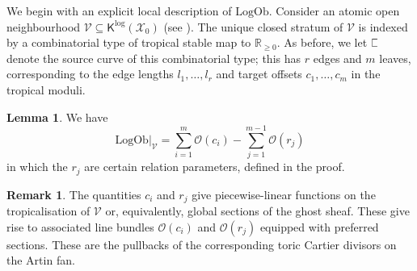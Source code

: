 \documentclass[11pt]{amsart}
\theoremstyle{definition}
\theoremstyle{definition}
\newtheorem{lemma}[theorem]{Lemma}
\newtheorem{remark}[theorem]{Remark}
\newcommand{\RR}{\mathbb{R}}
\newcommand{\sqC}{\scalebox{0.8}[1.2]{$\sqsubset$}}
\newcommand{\OO}{\mathcal{O}}
\newcommand{\LogOb}{\mathrm{LogOb}}
\newcommand{\Xcal}{\mathcal{X}}
\newcommand{\Kup}{\mathsf{K}}
\begin{document}
We begin with an explicit local description of $\LogOb$. Consider an atomic open neighbourhood $\mathcal{V} \subseteq \Kup^{\log}(\Xcal_0)$ (see \cite[\S 2.2]{AbramovichWiseBirational}). The unique closed stratum of $\mathcal{V}$ is indexed by a combinatorial type of tropical stable map to $\RR_{\geq 0}$. As before, we let $\sqC$ denote the source curve of this combinatorial type; this has $r$ edges and $m$ leaves, corresponding to the edge lengths $l_1,\ldots,l_r$ and target offsets $c_1,\ldots,c_m$ in the tropical moduli.

\begin{lemma}\label{lem: LogOb description 1} We have
\begin{equation*}\LogOb|_{\mathcal{V}} = \sum_{i=1}^m \OO(c_i) - \sum_{j=1}^{m-1} \OO(r_j)\end{equation*}
in which the $r_j$ are certain relation parameters, defined in the proof.\end{lemma}

\begin{remark} The quantities $c_i$ and $r_j$ give piecewise-linear functions on the tropicalisation of $\mathcal{V}$ or, equivalently, global sections of the ghost sheaf. These give rise to associated line bundles $\OO(c_i)$ and $\OO(r_j)$ equipped with preferred sections. These are the pullbacks of the corresponding toric Cartier divisors on the Artin fan.\end{remark}
\end{document}
